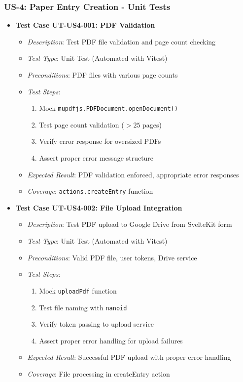 \documentclass[12pt]{article}
\begin{document}
\subsubsection{US-4: Paper Entry Creation - Unit Tests}
\begin{itemize}
  \item \textbf{Test Case UT-US4-001: PDF Validation}
    \begin{itemize}
      \item \textit{Description}: Test PDF file validation and page count checking
      \item \textit{Test Type}: Unit Test (Automated with Vitest)
      \item \textit{Preconditions}: PDF files with various page counts
      \item \textit{Test Steps}:
        \begin{enumerate}
          \item Mock \texttt{mupdfjs.PDFDocument.openDocument()}
          \item Test page count validation ($>25$ pages)
          \item Verify error response for oversized PDFs
          \item Assert proper error message structure
        \end{enumerate}
      \item \textit{Expected Result}: PDF validation enforced, appropriate error responses
      \item \textit{Coverage}: \texttt{actions.createEntry} function
    \end{itemize}

  \item \textbf{Test Case UT-US4-002: File Upload Integration}
    \begin{itemize}
      \item \textit{Description}: Test PDF upload to Google Drive from SvelteKit form
      \item \textit{Test Type}: Unit Test (Automated with Vitest)
      \item \textit{Preconditions}: Valid PDF file, user tokens, Drive service
      \item \textit{Test Steps}:
        \begin{enumerate}
          \item Mock \texttt{uploadPdf} function
          \item Test file naming with \texttt{nanoid}
          \item Verify token passing to upload service
          \item Assert proper error handling for upload failures
        \end{enumerate}
      \item \textit{Expected Result}: Successful PDF upload with proper error handling
      \item \textit{Coverage}: File processing in createEntry action
    \end{itemize}
\end{itemize}
\end{document}
